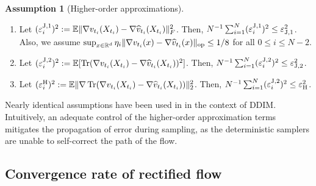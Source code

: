 \documentclass{article}
\theoremstyle{plain}
\theoremstyle{definition}
\newtheorem{assumption}[theorem]{Assumption}
\theoremstyle{remark}
\def\bbE{\mathbb{E}}
\def\bbR{\mathbb{R}}
\def\Norm#1{\Vert#1\Vert}
\def\op{{\rm op}}
\def\evelJone{\varepsilon^{\rm J,1}}
\def\meanevelJone{\varepsilon_{\rm J,1}}
\def\evelJtwo{\varepsilon^{\rm J,2}}
\def\meanevelJtwo{\varepsilon_{\rm J,2}}
\def\evelH{\varepsilon^{\rm H}}
\def\meanevelH{\varepsilon_{\rm H}}
\DeclareMathOperator{\Tr}{Tr}
\begin{document}
\begin{assumption}[Higher-order approximations]
    \label{assumption: higher-order approximation error}
   $\;$%
    \begin{enumerate}[label=(\alph*)]
        \item \label{assumption: Jone} Let $(\evelJone_i)^2 := \bbE \Norm{\nabla v_{t_i}(X_{t_i}) - \nabla \widehat v_{t_i}(X_{t_i})}_F^2$. Then, $N^{-1} \sum_{i =1}^N (\evelJone_i)^2 \le \meanevelJone^2$. Also, we assume $\sup_{x \in \bbR^d} \eta_i \Norm{\nabla v_{t_i}(x) - \nabla \widehat v_{t_i}(x)}_{\op} \le 1/8$ for all $0 \le i \le N-2$.

        \item \label{assumption: Jtwo} Let $(\evelJtwo_i)^2 := \bbE [\Tr(\nabla v_{t_i}(X_{t_i}) - \nabla \widehat v_{t_i}(X_{t_i}))^2]$. Then, $N^{-1} \sum_{i =1}^N (\evelJtwo_i)^2 \le \meanevelJtwo^2$.

        \item \label{assumption: Hessian} Let $(\evelH_i)^2 := \bbE \Norm{\nabla \Tr(\nabla v_{t_i}(X_{t_i}) - \nabla \widehat v_{t_i}(X_{t_i}))}_2^2$. Then, $N^{-1} \sum_{i =1}^N (\evelJtwo_i)^2 \le \meanevelH^2$.
    \end{enumerate}
\end{assumption}
Nearly identical assumptions have been used in \citet{liang2025low} in the context of DDIM. Intuitively, an adequate control of the higher-order approximation terms mitigates the propagation of  error during sampling, as the deterministic samplers are unable to self-correct the path of the flow. 
\subsection{Convergence rate of rectified flow}
\end{document}
